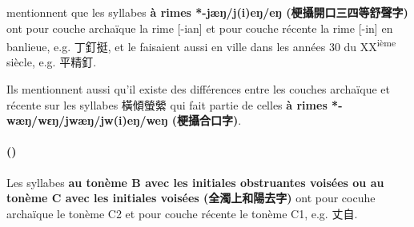 \documentclass{scrbook}
\newcounter{c}[subsubsection]
\newcommand{\stpc}[1]{\stepcounter{#1}}
\newcommand{\difwenbai}{couches archaïque et récente\xspace}
\newcommand{\termyyx}[1]{\textbf{#1}}
\begin{document}
\begin{sloppypar}
\textcite[58--59]{Bao1999changsha} mentionnent que les syllabes \termyyx{à rimes *-jæŋ/j(i)eŋ/eŋ (梗攝開口三四等舒聲字)} ont pour couche archaïque la rime [-ian] et pour couche récente la rime [-in] en banlieue, e.g. 丁釘挺, et le faisaient aussi en ville dans les années 30 du XX\textsuperscript{ième} siècle, e.g. 平精釘.

Ils mentionnent aussi qu'il existe des différences entre les \difwenbai sur les syllabes 橫傾螢縈 qui fait partie de celles \termyyx{à rimes *-wæŋ/wɛŋ/jwæŋ/jw(i)eŋ/weŋ (梗攝合口字)}.

\stpc{c}\paragraph{()}
Les syllabes \termyyx{au tonème B avec les initiales obstruantes voisées ou au tonème C avec les initiales voisées (全濁上和陽去字)} ont pour cocuhe archaïque le tonème C2 et pour couche récente le tonème C1, e.g. 丈自.


\end{sloppypar}
\end{document}
